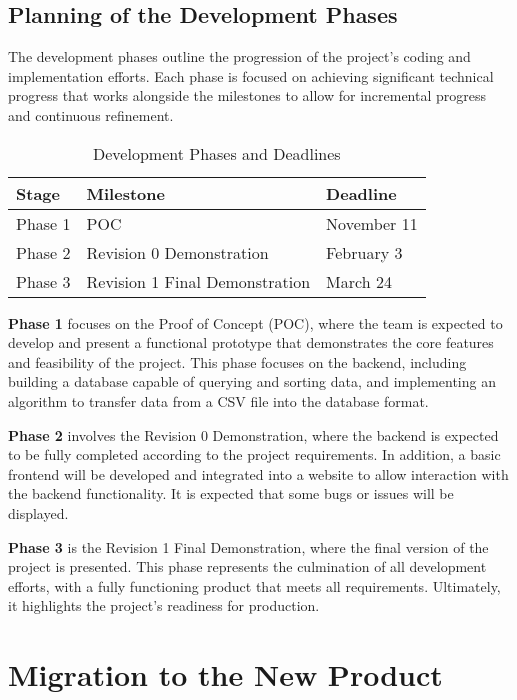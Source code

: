 \documentclass[12pt]{article}
\begin{document}
\subsection{Planning of the Development Phases}

The development phases outline the progression of the project's coding and
implementation efforts. Each phase is focused on achieving significant technical
progress that works alongside the milestones to allow for incremental progress
and continuous refinement.

\begin{table}[htbp]
  \centering
  \begin{tabular}{|l|l|l|}
\hline
\textbf{Stage} & \textbf{Milestone} & \textbf{Deadline} \\
\hline
Phase 1 & POC & November 11 \\
\hline
Phase 2 & Revision 0 Demonstration & February 3 \\
\hline
Phase 3 & Revision 1 Final Demonstration & March 24 \\
\hline
\end{tabular}
\caption{Development Phases and Deadlines}
\end{table}

\textbf{Phase 1} focuses on the Proof of Concept (POC), where the team is
expected to develop and present a functional prototype that demonstrates the
core features and feasibility of the project. This phase focuses on the backend,
including building a database capable of querying and sorting data, and
implementing an algorithm to transfer data from a CSV file into the database
format.

\textbf{Phase 2} involves the Revision 0 Demonstration, where the backend is
expected to be fully completed according to the project requirements. In
addition, a basic frontend will be developed and integrated into a website to
allow interaction with the backend functionality. It is expected that some bugs
or issues will be displayed.

\textbf{Phase 3} is the Revision 1 Final Demonstration, where the final version
of the project is presented. This phase represents the culmination of all
development efforts, with a fully functioning product that meets all
requirements. Ultimately, it highlights the project's readiness for production.


\section{Migration to the New Product}
\end{document}
